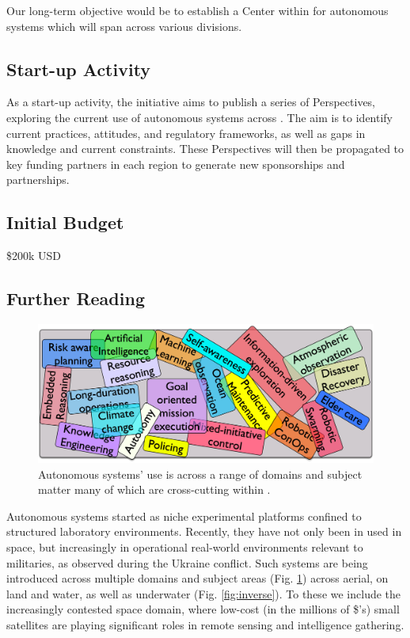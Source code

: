 \documentclass[11pt,letterpaper]{article}
\begin{document}
Our long-term objective would be to establish a Center within \org for autonomous systems which will span across various divisions.

\subsection{Start-up Activity}
As a start-up activity, the initiative aims to publish a series of Perspectives, exploring the current use of autonomous systems across \auke. The aim is to identify current practices, attitudes, and regulatory frameworks, as well as gaps in knowledge and current constraints. These Perspectives will then be propagated to key funding partners in each region to generate new sponsorships and partnerships. 

\subsection{Initial Budget}
\$200k USD

\pagebreak

\subsection{Further Reading}

\begin{figure}
  \vspace{-0.5cm}
  \centering
  \includegraphics[scale=0.06]{fig/word-bag.jpg}
  \caption{Autonomous systems' use is across a range of domains and
    subject matter many of which are cross-cutting within \orge.}
 \label{fig:topics}
\end{figure}

Autonomous systems started as niche experimental
platforms confined to structured laboratory environments. Recently, they have
not only been in used in space, but increasingly in operational
real-world environments relevant to militaries, as observed during the Ukraine conflict. Such systems are
being introduced across multiple domains and subject areas
(Fig. \ref{fig:topics}) across aerial, on land and water, as well as
underwater (Fig. \ref{fig:inverse}). To these we include the
increasingly contested space domain, where low-cost (in the millions
of \$'s) small satellites are playing significant roles in remote
sensing and intelligence gathering.
\end{document}
